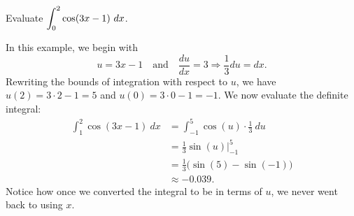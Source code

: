 \begin{example} \label{Ex:4.6.sub7}
Evaluate $\displaystyle\int_0^2 \cos(3x-1)\ dx$.

\solution
In this example, we begin with
\[ u = 3x - 1 \quad \mbox{and} \quad \frac{du}{dx} = 3 \Rightarrow \frac{1}{3}du = dx. \]
Rewriting the bounds of integration with respect to $u$, we have $u(2) = 3 \cdot 2 - 1 = 5$ and $u(0) = 3 \cdot 0 - 1 = -1$.   We now evaluate the definite integral:
\begin{align*}
\int_1^2 \cos(3x-1) \ dx &=	\int_{-1}^5 \cos(u) \cdot \frac{1}{3} \ du \\
&= \frac{1}{3} \sin(u) \Big|_{-1}^5 \\
&= \frac{1}{3}\big( \sin(5) - \sin(-1) \big)\\
&\approx -0.039.
\end{align*}
Notice how once we converted the integral to be in terms of $u$, we never went back to using $x$.

\end{example}